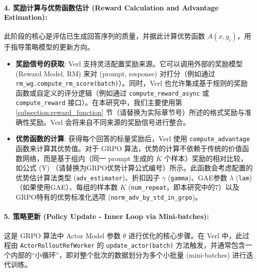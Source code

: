 \documentclass{pkuthesis}
\begin{document}
\paragraph{4. 奖励计算与优势函数估计 (Reward Calculation and Advantage Estimation):}
此阶段的核心是评估已生成回答序列的质量，并据此计算优势函数 $A(x, y_i)$，用于指导策略模型的更新方向。
\begin{itemize}
    \item \textbf{奖励信号的获取}: Verl 支持灵活配置奖励来源。它可以调用外部的奖励模型 (Reward Model, RM) 来对 (prompt, response) 对打分（例如通过 \texttt{rm\_wg.compute\_rm\_score(batch)}）。同时，Verl 也允许集成基于规则的奖励函数或自定义的评分逻辑（例如通过 \texttt{compute\_reward\_async} 或 \texttt{compute\_reward} 接口）。在本研究中，我们主要使用第 \ref{subsection:reward_function} 节（请替换为实际章节号）所述的格式奖励与准确性奖励。Verl 会将来自不同来源的奖励信号进行整合。

    \item \textbf{优势函数的计算}: 获得每个回答的标量奖励后，Verl 使用 \texttt{compute\_advantage} 函数来计算其优势值。对于 GRPO 算法，优势的计算不依赖于传统的价值函数网络，而是基于组内（同一 prompt 生成的 $K$ 个样本）奖励的相对比较，如公式 (Y) （请替换为GRPO优势计算公式编号）所示。此函数会考虑配置的优势估计算法类型 (\texttt{adv\_estimator})、折扣因子 $\gamma$ (\texttt{gamma})、GAE参数 $\lambda$ (\texttt{lam})（如果使用GAE）、每组的样本数 $K$ (\texttt{num\_repeat}，即本研究中的7）以及GRPO特有的优势标准化选项 (\texttt{norm\_adv\_by\_std\_in\_grpo})。
\end{itemize}

\paragraph{5. 策略更新 (Policy Update - Inner Loop via Mini-batches):}
这是 GRPO 算法中 Actor Model 参数 $\theta$ 进行优化的核心步骤。在 Verl 中，此过程由 \texttt{ActorRolloutRefWorker} 的 \texttt{update\_actor(batch)} 方法触发，并通常包含一个内部的“小循环”，即对整个批次的数据划分为多个小批量 (mini-batches) 进行迭代训练。
\end{document}
